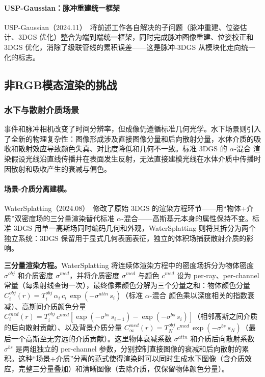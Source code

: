 \paragraph{USP-Gaussian：脉冲重建统一框架}
USP-Gaussian（2024.11）~\cite{2411_10504}将前述工作各自解决的子问题（脉冲重建、位姿估计、3DGS 优化）整合为端到端统一框架，同时完成脉冲图像重建、位姿校正和 3DGS 优化，消除了级联管线的累积误差——这是脉冲-3DGS 从模块化走向统一化的标志。

\subsection{非RGB模态渲染的挑战}

\subsubsection{水下与散射介质场景}

事件和脉冲相机改变了时间分辨率，但成像仍遵循标准几何光学。水下场景则引入了全新的物理复杂性：图像形成涉及直接图像分量和后向散射分量，水体介质的吸收和散射效应导致颜色失真、对比度降低和几何不一致。标准 3DGS 的 $\alpha$-混合 渲染假设光线沿直线传播并在表面发生反射，无法直接建模光线在水体介质中传播时因散射和吸收产生的衰减与偏色。

\paragraph{场景-介质分离建模。} WaterSplatting（2024.08）~\cite{2408_08206}修改了原始 3DGS 的渲染方程环节——用“物体+介质”双密度场的三分量渲染替代标准 $\alpha$-混合——高斯基元本身的属性保持不变。标准 3DGS 用单一高斯场同时编码几何和外观，WaterSplatting 则将其拆分为两个独立系统：3DGS 保留用于显式几何表面表征，独立的体积场捕获散射介质的影响。

\textbf{三分量渲染方程。}WaterSplatting 将连续体渲染方程中的密度场拆分为物体密度 $\sigma^{obj}$ 和介质密度 $\sigma^{med}$，并将介质密度 $\sigma^{med}$ 与颜色 $c^{med}$ 设为 per-ray、per-channel 常量（每条射线查询一次），最终像素颜色分解为三个分量之和：物体颜色分量 $C_i^{obj}(r) = T_i^{obj}\,\alpha_i\,c_i\,\exp(-\sigma^{attn}\,s_i)$（标准 $\alpha$-混合 颜色乘以深度相关的指数衰减）、高斯间介质颜色分量 $C_i^{med}(r) = T_i^{obj}\,c^{med}[\exp(-\sigma^{bs}\,s_{i-1}) - \exp(-\sigma^{bs}\,s_i)]$（相邻高斯之间介质的后向散射贡献）、以及背景介质分量 $C_\infty^{med}(r) = T_N^{obj}\,c^{med}\,\exp(-\sigma^{bs}\,s_N)$（最后一个高斯至无穷远的介质贡献）。这里物体衰减系数 $\sigma^{attn}$ 和介质后向散射系数 $\sigma^{bs}$ 是两组独立的 per-channel 参数，分别控制直接图像的衰减和后向散射的累积。这种“场景+介质”分离的范式使得渲染时可以同时生成水下图像（含介质效应，完整三分量叠加）和清晰图像（去除介质，仅保留物体颜色分量）。

